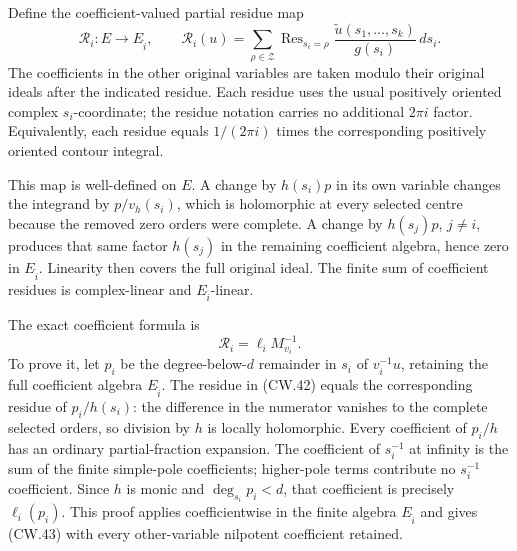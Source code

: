 Define the coefficient-valued partial residue map
\[
 \mathcal R_i:E\longrightarrow E_{\widehat i},\qquad
 \mathcal R_i(u)=
 \sum_{\rho\in\mathcal Z}\operatorname{Res}_{s_i=\rho}
 \frac{\widetilde u(s_1,\ldots,s_k)}{g(s_i)}\,ds_i .
 \tag{CW.42}
\]
The coefficients in the other original variables are taken
modulo their original ideals after the indicated residue.
Each residue uses the usual positively oriented complex
\(s_i\)-coordinate; the residue notation carries no
additional \(2\pi i\) factor.  Equivalently, each residue
equals \(1/(2\pi i)\) times the corresponding positively
oriented contour integral.

This map is well-defined on \(E\).  A change by \(h(s_i)p\)
in its own variable changes the integrand by \(p/v_h(s_i)\),
which is holomorphic at every selected centre because the
removed zero orders were complete.  A change by \(h(s_j)p\),
\(j\ne i\), produces that same factor \(h(s_j)\) in the
remaining coefficient algebra, hence zero in \(E_{\widehat i}\).
Linearity then covers the full original ideal.
The finite sum of coefficient residues is complex-linear
and \(E_{\widehat i}\)-linear.

The exact coefficient formula is
\[
 \boxed{\mathcal R_i=\ell_iM_{v_i}^{-1}.}                         \tag{CW.43}
\]
To prove it, let \(p_i\) be the degree-below-\(d\) remainder
in \(s_i\) of \(v_i^{-1}u\), retaining the full coefficient
algebra \(E_{\widehat i}\).  The residue in (CW.42) equals
the corresponding residue of \(p_i/h(s_i)\): the difference
in the numerator vanishes to the complete selected orders,
so division by \(h\) is locally holomorphic.
Every coefficient of \(p_i/h\) has an ordinary
partial-fraction expansion.  The coefficient of \(s_i^{-1}\)
at infinity is the sum of the finite simple-pole
coefficients; higher-pole terms contribute no \(s_i^{-1}\)
coefficient.  Since \(h\) is monic and
\(\deg_{s_i}p_i<d\), that coefficient is precisely
\(\ell_i(p_i)\).  This proof applies coefficientwise in
the finite algebra \(E_{\widehat i}\) and gives (CW.43)
with every other-variable nilpotent coefficient retained.

